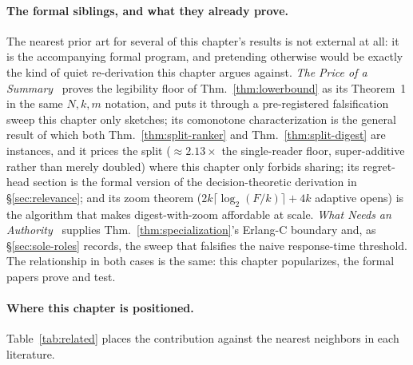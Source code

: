 \documentclass[11pt,a4paper]{article}
\theoremstyle{definition}
\theoremstyle{plain}
\begin{document}
\paragraph{The formal siblings, and what they already prove.}
The nearest prior art for several of this chapter's results is not external at all: it
is the accompanying formal program, and pretending otherwise would be exactly the
kind of quiet re-derivation this chapter argues against. \emph{The Price of a
Summary}~ proves the legibility floor of Thm.~\ref{thm:lowerbound} as its
Theorem~1 in the same $N,k,m$ notation, and puts it through a pre-registered
falsification sweep this chapter only sketches; its comonotone characterization is the
general result of which both Thm.~\ref{thm:split-ranker} and
Thm.~\ref{thm:split-digest} are instances, and it prices the split ($\approx2.13\times$
the single-reader floor, super-additive rather than merely doubled) where this chapter
only forbids sharing; its regret-head section is the formal version of the
decision-theoretic derivation in \S\ref{sec:relevance}; and its zoom theorem
($2k\lceil\log_2(F/k)\rceil+4k$ adaptive opens) is the algorithm that makes
digest-with-zoom affordable at scale. \emph{What Needs an Authority}~
supplies Thm.~\ref{thm:specialization}'s Erlang-C boundary and, as
\S\ref{sec:sole-roles} records, the sweep that falsifies the naive response-time
threshold. The relationship in both cases is the same: this chapter popularizes, the
formal papers prove and test.

\paragraph{Where this chapter is positioned.}
Table~\ref{tab:related} places the contribution against the nearest neighbors in each
literature.
\end{document}

